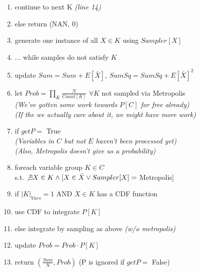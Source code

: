 \begin{figure}
\begin{algorithm}
\begin{enumerate}
\item \hspace*{0.6in} continue to next K \textit{(line 14)}
\item \hspace*{0.5in} else return (NAN, 0)
\item \hspace*{0.4in} generate one instance of all $X \in K$ using $Sampler[X]$
\item \hspace*{0.3in} ... while samples do not satisfy $K$
\item \hspace*{0.2in} update $Sum = Sum + E[\bar X]$, $SumSq = SumSq + E[\bar X]^2$
\item \hspace*{0.1in} let $Prob = \prod_K \frac{N}{Count[K]}$ $\forall K$ not sampled via Metropolis
\\    \hspace*{0.1in} \textit{(We've gotten some work towards $P[C]$ for free already)}
\\    \hspace*{0.1in} \textit{(If the we actually care about it, we might have more work)}
\item \hspace*{0.1in} if $getP =$ True
\\    \hspace*{0.2in} \textit{(Variables in $C$ but not $E$ haven't been processed yet)}
\\    \hspace*{0.2in} \textit{(Also, Metropolis doesn't give us a probability)}
\item \hspace*{0.2in} foreach variable group $K \in C$ \\ \hspace*{0.5in}s.t. $\not\exists X \in K \wedge [X \in \bar X \vee Sampler[X] =$ Metropolis$]$ 
\item \hspace*{0.3in} if $|K|_{Vars} = 1$ AND $X\in K$ has a CDF function
\item \hspace*{0.4in} use CDF to integrate $P[K]$
\item \hspace*{0.3in} else integrate by sampling as above \textit{(w/o metropolis)}
\item \hspace*{0.3in} update $Prob = Prob \cdot P[K]$
\item \hspace*{0.1in} return $(\frac{Sum}{N}, Prob)$ (P is ignored if $getP =$ False)
\end{enumerate}
\end{algorithm}\vspace*{-0.2in}
\end{figure}


